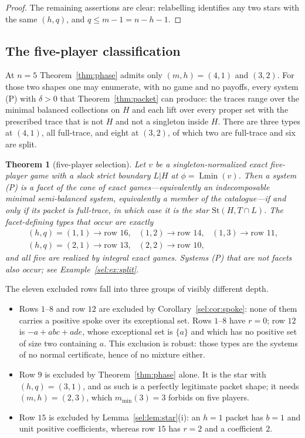 \documentclass[11pt]{article}
\newtheorem{theorem}{Theorem}
\newcommand{\Lmin}{\operatorname{Lmin}}
\begin{document}
\begin{proof}
The remaining assertions are clear: relabelling identifies any two stars with
the same $(h,q)$, and $q\le m-1=n-h-1$.
\end{proof}

\subsection{The five-player classification}

At $n=5$ Theorem~\ref{thm:phase} admits only $(m,h)=(4,1)$ and $(3,2)$.  For
those two shapes one may enumerate, with no game and no payoffs, every system
(P) with $\delta>0$ that Theorem~\ref{thm:packet} can produce: the traces range
over the minimal balanced collections on $H$ and each lift over every proper set
with the prescribed trace that is not $H$ and not a singleton inside $H$.  There
are three types at $(4,1)$, all full-trace, and eight at $(3,2)$, of which two
are full-trace and six are split.

\begin{theorem}[five-player selection]\label{sel:thm:n5}
Let $v$ be a singleton-normalized exact five-player game with a slack strict
boundary $L|H$ at $\phi=\Lmin(v)$.  Then a system (P) is a facet of the cone of
exact games---equivalently an indecomposable minimal semi-balanced system,
equivalently a member of the catalogue---if and only if its packet is
full-trace, in which case it is the star $\mathrm{St}(H,T\cap L)$.  The
facet-defining types that occur are exactly
\[
 \begin{array}{llll}
  (h,q)=(1,1)\to\text{row }16, &(1,2)\to\text{row }14, &(1,3)\to\text{row }11,\\
  (h,q)=(2,1)\to\text{row }13, &(2,2)\to\text{row }10, &
 \end{array}
\]
and all five are realized by integral exact games.  Systems (P) that are not
facets also occur; see Example~\ref{sel:ex:split}.
\end{theorem}

The eleven excluded rows fall into three groups of visibly different depth.

\begin{itemize}[nosep]
\item Rows $1$--$8$ and row $12$ are excluded by Corollary~\ref{sel:cor:spoke}:
      none of them carries a positive spoke over its exceptional set.  Rows
      $1$--$8$ have $r=0$; row $12$ is $-a+abc+ade$, whose exceptional set is
      $\{a\}$ and which has no positive set of size two containing $a$.  This
      exclusion is robust: those types are the systems of no normal
      certificate, hence of no mixture either.
\item Row $9$ is excluded by Theorem~\ref{thm:phase} alone.  It is the star with
      $(h,q)=(3,1)$, and as such is a perfectly legitimate packet shape; it
      needs $(m,h)=(2,3)$, which $m_{\min}(3)=3$ forbids on five players.
\item Row $15$ is excluded by Lemma~\ref{sel:lem:star}(i): an $h=1$ packet has
      $b=1$ and unit positive coefficients, whereas row $15$ has $r=2$ and a
      coefficient $2$.
\end{itemize}
\end{document}
